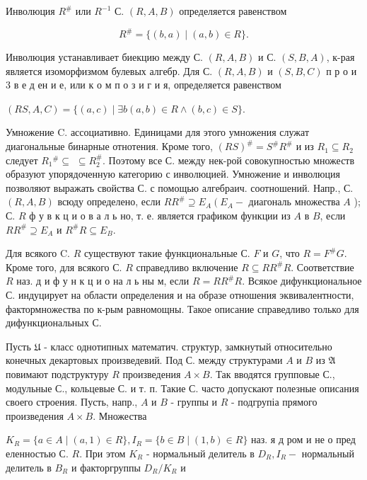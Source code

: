 \documentclass[10pt]{article}
\begin{document}
Инволюция $R^{\#}$ или $R^{-1}$ С. $(R, A, B)$ определяется равенством



\[

R^{\#}=\{(b, a) \mid(a, b) \in R\} .

\]



Инволюция устанавливает биекцию между С. $(R, A, B)$ и С. $(S, B, A)$, к-рая является изоморфизмом булевых алгебр. Для С. $(R, A, B)$ и $(S, B, C)$ п р о и 3 в е д ен и е, или к о м п о з и г и я, определяется равенством



$(R S, A, C)=\{(a, c) \mid \exists b(a, b) \in R \wedge(b, c) \in S\}$.



Умножение C. ассоциативно. Единицами для этого умножения служат диагональные бинарные отнотения. Кроме того, $(R S)^{\#}=S^{\#} R^{\#}$ и из $R_{1} \subseteq R_{2}$ следует $R_{1}{ }^{\#} \subseteq$ $\subseteq R_{2}^{\#}$. Поэтому все С. между нек-рой совокупностью множеств образуют упорядоченную категорию с инволюцией. Умножение и инволюция позволяют выражать свойства С. с помощью алгебраич. соотношений. Напр., С. $(R, A, B)$ всюду определено, если $R R^{\#} \supseteq E_{A}\left(E_{A}-\right.$ диагональ множества $A$ ); С. $R$ ф у в к ц и о в а л ь но, т. е. является графиком функции из $A$ в $B$, если $R R^{\#} \supseteq E_{A}$ и $R^{\#} R \subseteq E_{B}$.



Для всякого C. $R$ существуют такие функциональные С. $F$ и $G$, что $R=F^{\#} G$. Кроме того, для всякого С. $R$ справедливо включение $R \subseteq R R^{\#} R$. Соответствие $R$ наз. д и ф у н к ц и о на л ь ны м, если $R=R R^{\#} R$. Всякое дифункциональное С. индуцирует на области определения и на образе отношения эквивалентности, фактормножества по к-рым равномощны. Такое описание справедливо только для дифункциональных С.



Пусть $\mathfrak{U}$ - класс однотипных математич. структур, замкнутый относительно конечных декартовых произведевий. Под С. между структурами $A$ и $B$ из $\mathfrak{A}$ повимают подструктуру $R$ произведения $A \times B$. Так вводятся групповые С., модульные С., кольцевые С. и т. п. Такие С. часто допускают полезные описания своего строения. Пусть, напр., $A$ и $B$ - группы и $R$ - подгрупіа прямого произведения $A \times B$. Множества



$K_{R}=\{a \in A \mid(a, 1) \in R\}, I_{R}=\{b \in B \mid(1, b) \in R\}$ наз. я д ром и не о пред еленностью С. $R$. При этом $K_{R}$ - нормальный делитель в $D_{R}, I_{R}-$ нормальный делитель в $B_{R}$ и факторгруппы $D_{R} / K_{R}$ и
\end{document}
